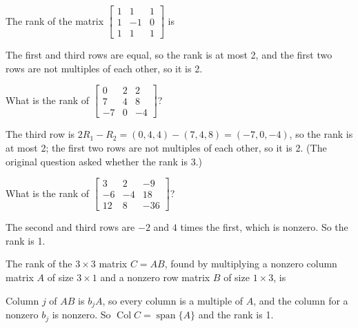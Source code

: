
\begin{question}[id=gate-ec2006-1, source=GATE EC 2006]
The rank of the matrix $\begin{bmatrix} 1 & 1 & 1 \\ 1 & -1 & 0 \\ 1 & 1 & 1 \end{bmatrix}$ is
\begin{options}
\end{options}
\begin{solution}
The first and third rows are equal, so the rank is at most 2, and the first two rows are not multiples of each other, so it is 2.
\end{solution}
\end{question}

\begin{question}[id=gate-me1994-1, source=GATE ME 1994 (adapted)]
What is the rank of $\begin{bmatrix} 0 & 2 & 2 \\ 7 & 4 & 8 \\ -7 & 0 & -4 \end{bmatrix}$?
\begin{solution}
The third row is $2R_1 - R_2 = (0, 4, 4) - (7, 4, 8) = (-7, 0, -4)$, so the rank is at most 2; the first two rows are not multiples of each other, so it is 2. (The original question asked whether the rank is 3.)
\end{solution}
\end{question}

\begin{question}[id=gate-me1999-1, source=GATE ME 1999 (adapted)]
What is the rank of $\begin{bmatrix} 3 & 2 & -9 \\ -6 & -4 & 18 \\ 12 & 8 & -36 \end{bmatrix}$?
\begin{solution}
The second and third rows are $-2$ and $4$ times the first, which is nonzero. So the rank is 1.
\end{solution}
\end{question}

\begin{question}[id=gate-me2001-1, source=GATE ME 2001]
The rank of the $3 \times 3$ matrix $C = AB$, found by multiplying a nonzero column matrix $A$ of size $3 \times 1$ and a nonzero row matrix $B$ of size $1 \times 3$, is
\begin{options}
\end{options}
\begin{solution}
Column $j$ of $AB$ is $b_j A$, so every column is a multiple of $A$, and the column for a nonzero $b_j$ is nonzero. So $\operatorname{Col} C = \operatorname{span}\{A\}$ and the rank is 1.
\end{solution}
\end{question}

